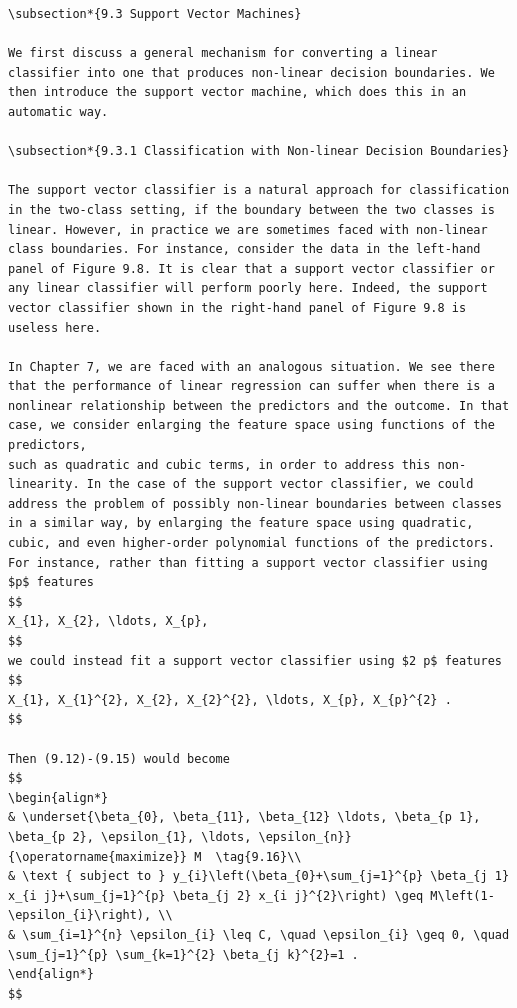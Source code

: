 \documentclass[10pt]{article}
\begin{document}
\begin{verbatim}
\subsection*{9.3 Support Vector Machines}

We first discuss a general mechanism for converting a linear classifier into one that produces non-linear decision boundaries. We then introduce the support vector machine, which does this in an automatic way.

\subsection*{9.3.1 Classification with Non-linear Decision Boundaries}

The support vector classifier is a natural approach for classification in the two-class setting, if the boundary between the two classes is linear. However, in practice we are sometimes faced with non-linear class boundaries. For instance, consider the data in the left-hand panel of Figure 9.8. It is clear that a support vector classifier or any linear classifier will perform poorly here. Indeed, the support vector classifier shown in the right-hand panel of Figure 9.8 is useless here.

In Chapter 7, we are faced with an analogous situation. We see there that the performance of linear regression can suffer when there is a nonlinear relationship between the predictors and the outcome. In that case, we consider enlarging the feature space using functions of the predictors,
such as quadratic and cubic terms, in order to address this non-linearity. In the case of the support vector classifier, we could address the problem of possibly non-linear boundaries between classes in a similar way, by enlarging the feature space using quadratic, cubic, and even higher-order polynomial functions of the predictors. For instance, rather than fitting a support vector classifier using $p$ features
$$
X_{1}, X_{2}, \ldots, X_{p},
$$
we could instead fit a support vector classifier using $2 p$ features
$$
X_{1}, X_{1}^{2}, X_{2}, X_{2}^{2}, \ldots, X_{p}, X_{p}^{2} .
$$

Then (9.12)-(9.15) would become
$$
\begin{align*}
& \underset{\beta_{0}, \beta_{11}, \beta_{12} \ldots, \beta_{p 1}, \beta_{p 2}, \epsilon_{1}, \ldots, \epsilon_{n}}{\operatorname{maximize}} M  \tag{9.16}\\
& \text { subject to } y_{i}\left(\beta_{0}+\sum_{j=1}^{p} \beta_{j 1} x_{i j}+\sum_{j=1}^{p} \beta_{j 2} x_{i j}^{2}\right) \geq M\left(1-\epsilon_{i}\right), \\
& \sum_{i=1}^{n} \epsilon_{i} \leq C, \quad \epsilon_{i} \geq 0, \quad \sum_{j=1}^{p} \sum_{k=1}^{2} \beta_{j k}^{2}=1 .
\end{align*}
$$


\end{verbatim}
\end{document}
